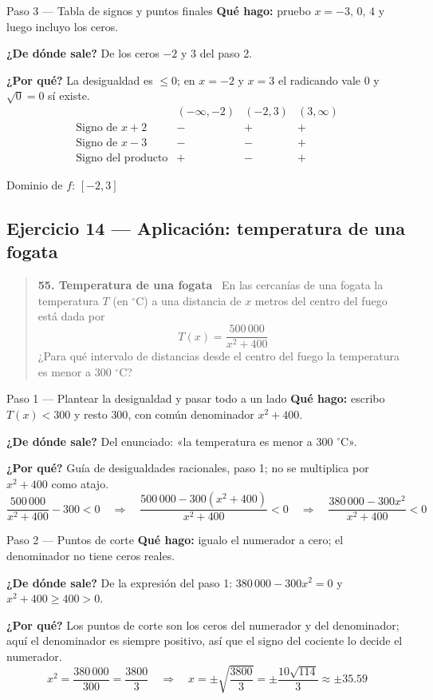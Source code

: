 \documentclass[11pt]{article}
\begin{document}
\begin{paso}{Paso 3 --- Tabla de signos y puntos finales}
\textbf{Qué hago:} pruebo $x=-3,\,0,\,4$ y luego incluyo los ceros.

\textbf{¿De dónde sale?} De los ceros $-2$ y $3$ del paso 2.

\textbf{¿Por qué?} La desigualdad es $\le 0$; en $x=-2$ y $x=3$ el radicando vale $0$ y $\sqrt{0}=0$ sí existe.
\[
\begin{array}{l|ccc}
 & (-\infty,-2) & (-2,3) & (3,\infty)\\\hline
\text{Signo de } x+2 & - & + & +\\
\text{Signo de } x-3 & - & - & +\\\hline
\text{Signo del producto} & + & - & +
\end{array}
\]
\end{paso}

\begin{resp}
Dominio de $f$: $[-2,3]$
\end{resp}

\subsection*{Ejercicio 14 — Aplicación: temperatura de una fogata}

\begin{quote}
\textbf{55. Temperatura de una fogata} \ En las cercanías de una fogata la temperatura $T$ (en $^\circ$C) a una distancia de $x$ metros del centro del fuego está dada por
\[
T(x)=\frac{500\,000}{x^2+400}
\]
¿Para qué intervalo de distancias desde el centro del fuego la temperatura es menor a 300 $^\circ$C?
\end{quote}

\begin{paso}{Paso 1 --- Plantear la desigualdad y pasar todo a un lado}
\textbf{Qué hago:} escribo $T(x)<300$ y resto $300$, con común denominador $x^2+400$.

\textbf{¿De dónde sale?} Del enunciado: «la temperatura es menor a 300 $^\circ$C».

\textbf{¿Por qué?} Guía de desigualdades racionales, paso 1; no se multiplica por $x^2+400$ como atajo.
\[
\frac{500\,000}{x^2+400}-300<0
\quad\Longrightarrow\quad
\frac{500\,000-300(x^2+400)}{x^2+400}<0
\quad\Longrightarrow\quad
\frac{380\,000-300x^2}{x^2+400}<0
\]
\end{paso}

\begin{paso}{Paso 2 --- Puntos de corte}
\textbf{Qué hago:} igualo el numerador a cero; el denominador no tiene ceros reales.

\textbf{¿De dónde sale?} De la expresión del paso 1: $380\,000-300x^2=0$ y $x^2+400\ge 400>0$.

\textbf{¿Por qué?} Los puntos de corte son los ceros del numerador y del denominador; aquí el denominador es siempre positivo, así que el signo del cociente lo decide el numerador.
\[
x^2=\frac{380\,000}{300}=\frac{3800}{3}
\quad\Longrightarrow\quad
x=\pm\sqrt{\frac{3800}{3}}=\pm\frac{10\sqrt{114}}{3}\approx\pm 35.59
\]
\end{paso}
\end{document}
